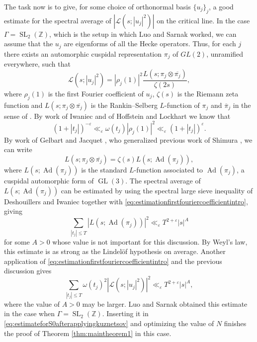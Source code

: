 \documentclass{article}
\theoremstyle{named}
\newcommand{\Z}{\mathbb{Z}}
\renewcommand{\L}{\mathcal{L}}
\DeclareMathOperator{\SL}{SL}
\DeclareMathOperator{\GL}{GL}
\DeclareMathOperator{\Ad}{Ad}
\begin{document}
The task now is to give, for some choice of orthonormal basis $\{u_j\}_j$, a good estimate for the spectral average of $|\L(s; |u_j|^2)|$ on the critical line. In the case $\Gamma = \SL_2(\Z)$, which is the setup in which Luo and Sarnak worked, we can assume that the $u_j$ are eigenforms of all the Hecke operators. Thus, for each $j$ there exists an automorphic cuspidal representation $\pi_j$ of $GL(2)$, unramified everywhere, such that 
\begin{equation*}
    \L(s; |u_j|^2) = |\rho_j(1)|^2 \frac{L(s; \pi_j \otimes \overline{\pi_j})}{\zeta(2s)},
\end{equation*}
where $\rho_j(1)$ is the first Fourier coefficient of $u_j$,  $\zeta(s)$ is the Riemann zeta function and $L(s; \pi_j \otimes \overline{\pi_j})$ is the Rankin--Selberg $L$-function of $\pi_j$ and $\overline{\pi}_j$ in the sense of \cite{jacquetrankinselberg}. By work of Iwaniec \cite{iwaniecsmalleigenvalues} and of Hoffstein and Lockhart \cite{hoffsteinlockhart} we know that 
\begin{equation}\label{eq:estimationfirstfouriercoefficientintro}
    (1 + |t_j|)^{-\varepsilon} \ll_{\varepsilon} \omega(t_j)|\rho_j(1)|^2 \ll_\varepsilon (1 + |t_j|)^\varepsilon.
\end{equation}
By work of Gelbart and Jacquet \cite{gelbartjacquetlift}, who generalized previous work of Shimura \cite{shimuraholomorphy}, we can write 
\begin{equation*}
    L(s; \pi_j \otimes \overline{\pi_j}) = \zeta(s)L(s; \Ad(\pi_j)),
\end{equation*}
where $L(s; \Ad(\pi_j))$ is the standard $L$-function associated to $\Ad(\pi_j)$, a cuspidal automorphic form of $\GL(3)$. The spectral average of $L(s; \Ad(\pi_j))$ can be estimated by using the spectral large sieve inequality of Deshouillers and Iwaniec \cite[Theorem 2]{deshouillersiwaniec82} together with \eqref{eq:estimationfirstfouriercoefficientintro}, giving
\begin{equation}\label{eq:lindelofonaverageforadjointLfunctionsintro}
    \sum_{|t_j| \leq T} |L(s; \Ad(\pi_j))|^2 \ll_\varepsilon T^{2 + \varepsilon} |s|^A
\end{equation}
for some $A > 0$ whose value is not important for this discussion. By Weyl's law, this estimate is as strong as the Lindelöf hypothesis on average. Another application of \eqref{eq:estimationfirstfouriercoefficientintro} and the previous discussion gives
\begin{equation}\label{eq:lindelofonaverageRankinselbergintro}
    \sum_{|t_j| \leq T} \omega(t_j)^2|\L(s; |u_j|^2)|^2 \ll_\varepsilon T^{2 + \varepsilon} |s|^A,
\end{equation}
where the value of $A >0$ may be larger. Luo and Sarnak obtained this estimate in the case when $\Gamma = \SL_2(\Z)$. Inserting it in \eqref{eq:estimateforS0afterapplyingkuznetsov} and optimizing the value of $N$ finishes the proof of Theorem \ref{thm:maintheorem1} in this case.
\end{document}
